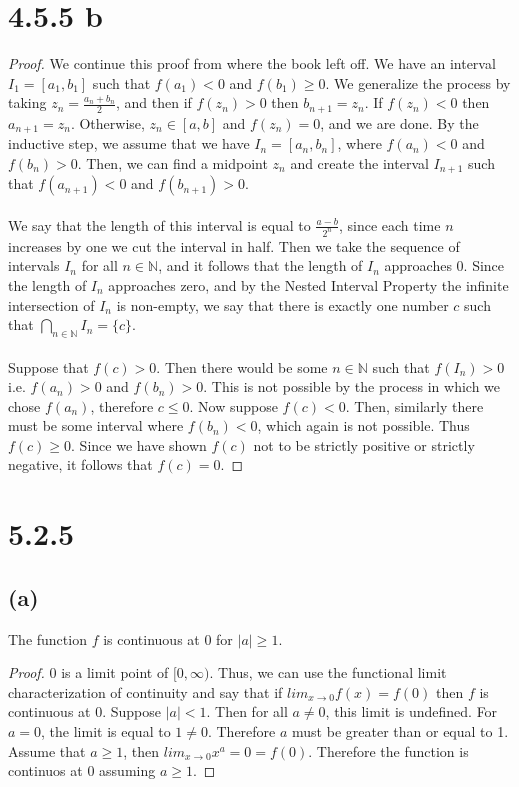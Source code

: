 \documentclass{article}
\begin{document}
\section*{4.5.5 b}
\begin{proof}
We continue this proof from where the book left off. We have an interval $I_1 = [a_1, b_1]$ such that $f(a_1) < 0$ and $f(b_1) \geqslant 0$. We generalize the process by taking $z_n = \frac{a_n + b_n}{2}$, and then if $f(z_n) > 0$ then $b_{n+1} = z_n$. If $f(z_n) < 0$ then $a_{n+1} = z_n$. Otherwise, $z_n \in [a,b]$ and $f(z_n) = 0$, and we are done. By the inductive step, we assume that we have $I_n = [a_n, b_n]$, where $f(a_n) < 0$ and $f(b_n) > 0$. Then, we can find a midpoint $z_n$ and create the interval $I_{n+1}$ such that $f(a_{n+1}) < 0$ and $f(b_{n+1}) > 0$. \\\\
We say that the length of this interval is equal to $\frac{a-b}{2^n}$, since each time $n$ increases by one we cut the interval in half. Then we take the sequence of intervals $I_n$ for all $n \in \mathbb{N}$, and it follows that the length of $I_n$ approaches 0. Since the length of $I_n$ approaches zero, and by the Nested Interval Property the infinite intersection of $I_n$ is non-empty, we say that there is exactly one number $c$ such that $\bigcap_{n \in \mathbb{N}}I_n = \{c\}$. \\\\
Suppose that $f(c) > 0$. Then there would be some $n \in \mathbb{N}$ such that $f(I_n) > 0$ i.e. $f(a_n) > 0$ and $f(b_n) > 0$. This is not possible by the process in which we chose $f(a_n)$, therefore $c \leqslant 0$. Now suppose $f(c) < 0$. Then, similarly there must be some interval where $f(b_n) < 0$, which again is not possible. Thus $f(c )\geqslant 0$. Since we have shown $f(c)$ not to be strictly positive or strictly negative, it follows that $f(c) = 0$.
\end{proof}

\section*{5.2.5}
\subsection*{(a)}
The function $f$ is continuous at 0 for $|a| \geqslant 1$.
\begin{proof}
0 is a limit point of $[0, \infty)$. Thus, we can use the functional limit characterization of continuity and say that if $lim_{x \rightarrow 0}f(x) = f(0)$ then $f$ is continuous at 0. Suppose $|a| <1$. Then for all $a \neq 0$, this limit is undefined. For $a=0$, the limit is equal to $1 \neq 0$. Therefore $a$ must be greater than or equal to 1. Assume that $a \geqslant 1$, then $lim_{x \rightarrow 0}x^a = 0 = f(0)$. Therefore the function is continuos at $0$ assuming $a \geqslant 1$.
\end{proof}
\end{document}
